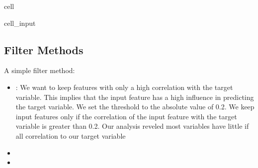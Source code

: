 \documentclass[letterpaper,10pt,english]{jupyterBook}
\begin{document}
\begin{sphinxuseclass}{cell}\begin{sphinxVerbatimInput}

\begin{sphinxuseclass}{cell_input}
\begin{sphinxVerbatim}[commandchars=\\\{\}]
  
\end{sphinxVerbatim}

\end{sphinxuseclass}\end{sphinxVerbatimInput}

\end{sphinxuseclass}

\subsection{Filter Methods}
\label{\detokenize{Model_evaluation:filter-methods}}
\sphinxAtStartPar
A simple filter method:
\begin{itemize}
\item {} 
\sphinxAtStartPar
{}: We want to keep features with only a high correlation with the target variable. This implies that the input feature has a high influence in predicting the target variable. We set the threshold to the absolute value of 0.2. We keep input features only if the correlation of the input feature with the target variable is greater than 0.2. Our analysis reveled most variables have little if all correlation to our target variable

\item {} 
\sphinxAtStartPar
{}

\item {} 
\sphinxAtStartPar
{}

\end{itemize}
\end{document}
